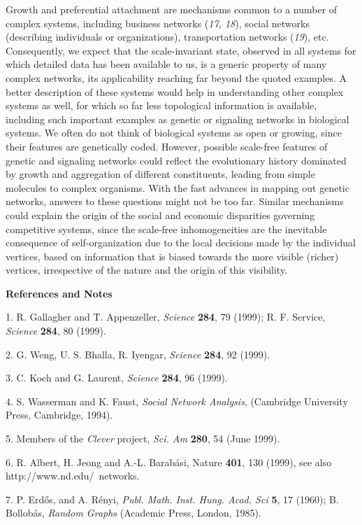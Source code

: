 Growth and preferential attachment are mechanisms common to a number of complex systems, including business networks ({\it 17, 18}), social networks (describing individuals  or organizations), transportation networks ({\it 19}), etc. Consequently, we expect that the scale-invariant state,  observed in all systems for which detailed data  has been available to us, is a generic property of many complex networks, its applicability reaching  far beyond the quoted examples. A better description  of these systems would help in understanding other complex systems as well, for which so far less topological information is available, including  such important examples as genetic or signaling networks in biological systems. We often do not think of biological systems as open  or growing, since their features are genetically coded. However, possible
scale-free features of genetic and signaling networks could reflect the
evolutionary history dominated by growth and aggregation of different constituents, leading
from simple molecules to complex organisms.  With the fast advances in
mapping out genetic networks, answers to these questions might not be
too far. Similar mechanisms could explain the origin of the social and economic disparities governing competitive systems, since the scale-free inhomogeneities are the inevitable  consequence  of self-organization due to the local decisions made by the individual vertices, based on information that is biased towards the more visible (richer) vertices, irrespective of the nature and the origin of this visibility.

{\bf References and Notes}


1. R. Gallagher and T. Appenzeller, {\it Science} {\bf 284}, 79 (1999); R. F. Service, {\it Science} {\bf 284}, 80 (1999).

2. G. Weng, U. S. Bhalla, R. Iyengar, {\it Science} {\bf 284}, 92 (1999).

3. C. Koch and G. Laurent, {\it Science} {\bf 284}, 96 (1999).

4. S. Wasserman and K. Faust, {\it Social Network Analysis}, (Cambridge University Press, Cambridge, 1994).

5. Members of the {\it Clever} project, {\it Sci. Am} {\bf 280}, 54 (June 1999).

6. R. Albert, H. Jeong and A.-L. Barab\'asi, Nature {\bf 401}, 130 (1999), see also http://www.nd.edu/~networks.

7. P. Erd\H{o}s, and  A. R\'enyi, {\it Publ. Math. Inst. Hung. Acad. Sci} {\bf 5}, 17 (1960); B. Bollob\'as, {\it Random Graphs} (Academic Press, London, 1985).

